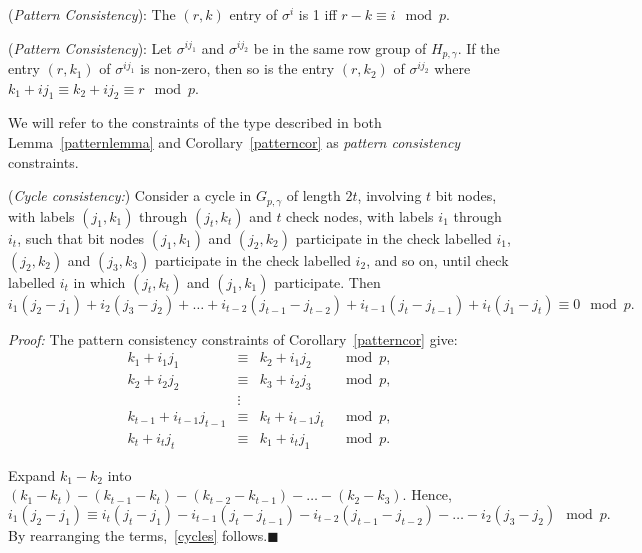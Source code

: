 \begin{lemma}\label{patternlemma}(\textit{Pattern Consistency}): The $(r,k)$ entry of $\sigma^{i}$
is 1 iff $r-k \equiv i \mod p$.
\end{lemma}
\begin{corollary}\label{patterncor}(\textit{Pattern Consistency}): Let
$\sigma^{ij_1}$ and $\sigma^{ij_2}$ be in the same row group of
$H_{p,\gamma}$. If the entry $(r,k_1)$ of $\sigma^{ij_1}$ is
non-zero, then so is the entry $(r,k_2)$ of $\sigma^{ij_2}$ where
$k_1+ij_1 \equiv k_2+ij_2 \equiv r \mod p$.
\end{corollary}

We will refer to the constraints of the type described in both
Lemma~\ref{patternlemma} and Corollary~\ref{patterncor} as
\textit{pattern consistency} constraints.

\begin{lemma}\label{cyclelemma}(\textit{Cycle consistency:}) Consider a cycle in $G_{p,\gamma}$ of
length $2t$, involving $t$ bit nodes, with labels $(j_1,k_1)$
through $(j_t,k_t)$ and $t$ check nodes, with labels $i_1$ through
$i_t$, such that bit nodes $(j_1,k_1)$ and $(j_2,k_2)$ participate
in the check labelled $i_1$, $(j_2,k_2)$ and $(j_3,k_3)$ participate
in the check labelled $i_2$, and so on, until check labelled $i_t$
in which $(j_t,k_t)$ and $(j_1,k_1)$ participate. Then
\begin{equation}\label{cycles}
i_1(j_2-j_1)+i_2(j_3-j_2)+\dots+i_{t-2}(j_{t-1}-j_{t-2})+i_{t-1}(j_t-j_{t-1})+
i_t(j_1-j_t) \equiv 0 \mod p.
\end{equation}
\end{lemma}
\noindent \textit{Proof:} The pattern consistency constraints of
Corollary~\ref{patterncor} give:
\begin{equation}\begin{array}{cccc}
k_1+i_1j_1 &\equiv&k_2+i_1j_2 & \mod p, \\
k_2+i_2j_2 &\equiv&k_3+i_2j_3 & \mod p, \\
{} & \vdots & {}\\
k_{t-1}+i_{t-1}j_{t-1} &\equiv&k_t+i_{t-1}j_t & \mod p, \\
k_t+i_tj_t &\equiv&k_1+i_tj_1 & \mod p.
\end{array}\end{equation}

Expand $k_1-k_2$ into
$(k_1-k_t)-(k_{t-1}-k_t)-(k_{t-2}-k_{t-1})-\dots-(k_2-k_3)$.
Hence,
\begin{equation}
i_1(j_2-j_1) \equiv
i_t(j_t-j_1)-i_{t-1}(j_t-j_{t-1})-i_{t-2}(j_{t-1}-j_{t-2})-\dots-i_2(j_3-j_2)
\mod p.
\end{equation} By rearranging the terms,~\eqref{cycles} follows.\hfill$\blacksquare$

